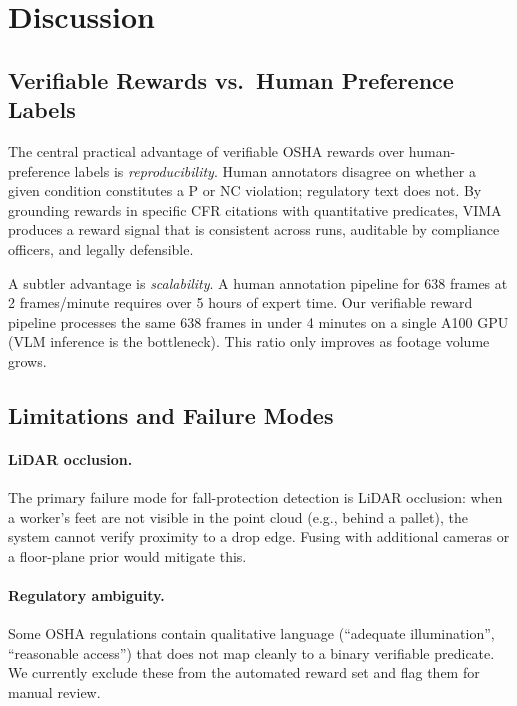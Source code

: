 \documentclass[sigconf,nonacm]{acmart}
\begin{document}
\section{Discussion}
\label{sec:discussion}

\subsection{Verifiable Rewards vs.\ Human Preference Labels}

The central practical advantage of verifiable OSHA rewards over
human-preference labels is \emph{reproducibility}.
Human annotators disagree on whether a given condition constitutes a
P or NC violation; regulatory text does not.
By grounding rewards in specific CFR citations with quantitative
predicates, VIMA produces a reward signal that is consistent across
runs, auditable by compliance officers, and legally defensible.

A subtler advantage is \emph{scalability}.
A human annotation pipeline for 638 frames at 2 frames/minute requires
over 5 hours of expert time.
Our verifiable reward pipeline processes the same 638 frames in under
4 minutes on a single A100 GPU (VLM inference is the bottleneck).
This ratio only improves as footage volume grows.

\subsection{Limitations and Failure Modes}

\paragraph{LiDAR occlusion.}
The primary failure mode for fall-protection detection is LiDAR
occlusion: when a worker's feet are not visible in the point cloud
(e.g., behind a pallet), the system cannot verify proximity to a
drop edge.
Fusing with additional cameras or a floor-plane prior would mitigate this.

\paragraph{Regulatory ambiguity.}
Some OSHA regulations contain qualitative language (``adequate
illumination'', ``reasonable access'') that does not map cleanly to
a binary verifiable predicate.
We currently exclude these from the automated reward set and flag them
for manual review.
\end{document}
